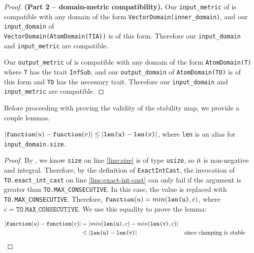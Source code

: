 \documentclass{article}
\begin{document}
\begin{proof} \textbf{(Part 2 -- domain-metric compatibility).}
    Our \texttt{input\_metric} of  is compatible with any domain of the form \texttt{VectorDomain(inner\_domain)}, 
    and our \texttt{input\_domain} of \\\texttt{VectorDomain(AtomDomain(TIA))} is of this form. 
    Therefore our \texttt{input\_domain} and \texttt{input\_metric} are compatible.

    Our \texttt{output\_metric} of  is compatible with any domain of the form \texttt{AtomDomain(T)} where \texttt{T} has the trait \texttt{InfSub}, 
    and our \texttt{output\_domain} of \texttt{AtomDomain(TO)} is of this form and \texttt{TO} has the necessary trait.
    Therefore our \texttt{input\_domain} and \texttt{input\_metric} are compatible.
\end{proof}

Before proceeding with proving the validity of the stability map, we provide a couple lemmas.

\begin{lemma}
    \label{dsym-sens}
    $|\texttt{function}(u) - \texttt{function}(v)| \leq |\texttt{len(u)} - \texttt{len(v)}|$, 
    where \texttt{len} is an alias for \\ \texttt{input\_domain.size}.
\end{lemma}

\begin{proof}
    By , we know \texttt{size} on line \ref{line:size} is of type \texttt{usize}, 
    so it is non-negative and integral.
    Therefore, by the definition of \texttt{ExactIntCast}, 
    the invocation of \texttt{TO.exact\_int\_cast} on line \ref{line:exact-int-cast} can only fail if the argument is greater than \texttt{TO.MAX\_CONSECUTIVE}.
    In this case, the value is replaced with \texttt{TO.MAX\_CONSECUTIVE}.
    Therefore, $\texttt{function}(u) = min(\texttt{len(u)}, c)$, where $c = \texttt{TO.MAX\_CONSECUTIVE}$.
    We use this equality to prove the lemma:

    \begin{align*}
        |\texttt{function}(u) - \texttt{function}(v)| &= |min(\texttt{len(u)}, c) - min(\texttt{len(v)}, c)| \\
        &\leq |\texttt{len(u)} - \texttt{len(v)}| &&\text{since clamping is stable} \\
    \end{align*}
\end{proof}
\end{document}

